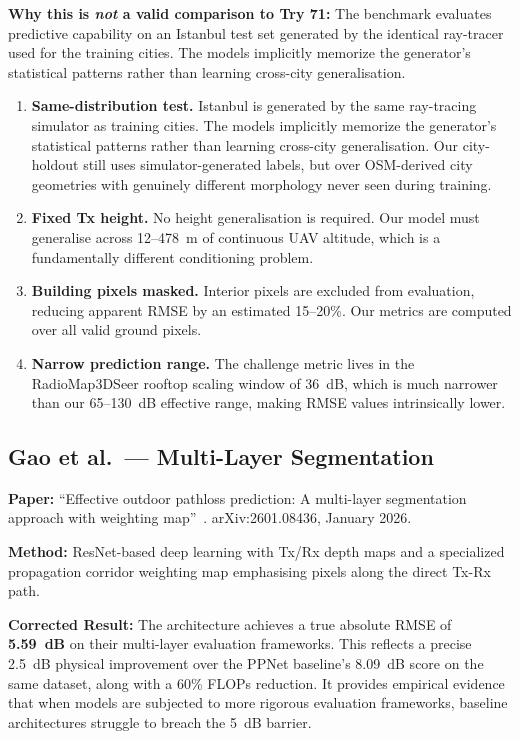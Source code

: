 \documentclass[11pt,a4paper]{article}
\begin{document}
\textbf{Why this is \emph{not} a valid comparison to Try 71:} The benchmark evaluates predictive capability on an Istanbul test set generated by the identical ray-tracer used for the training cities. The models implicitly memorize the generator's statistical patterns rather than learning cross-city generalisation.
\begin{enumerate}[nosep]
    \item \textbf{Same-distribution test.} Istanbul is generated by the same
          ray-tracing simulator as training cities. The models implicitly memorize
          the generator's statistical patterns rather than learning cross-city
          generalisation. Our city-holdout still uses simulator-generated labels,
          but over OSM-derived city geometries with genuinely different morphology
          never seen during training.

    \item \textbf{Fixed Tx height.} No height generalisation is required.
          Our model must generalise across 12--478~m of continuous UAV altitude,
          which is a fundamentally different conditioning problem.

    \item \textbf{Building pixels masked.} Interior pixels are excluded from
          evaluation, reducing apparent RMSE by an estimated 15--20\%. Our metrics
          are computed over all valid ground pixels.

    \item \textbf{Narrow prediction range.} The challenge metric lives in the
          RadioMap3DSeer rooftop scaling window of 36~dB, which is much narrower
          than our 65--130~dB effective range, making RMSE values intrinsically lower.
\end{enumerate}

\subsection{Gao et al.\ --- Multi-Layer Segmentation}

\textbf{Paper:} ``Effective outdoor pathloss prediction: A multi-layer segmentation
approach with weighting map''~\cite{gao2026}. arXiv:2601.08436, January 2026.

\textbf{Method:} ResNet-based deep learning with Tx/Rx depth maps and a specialized propagation corridor weighting map emphasising pixels along the direct Tx-Rx path.

\textbf{Corrected Result:} The architecture achieves a true absolute RMSE of \textbf{5.59~dB} on their multi-layer evaluation frameworks. This reflects a precise 2.5~dB physical improvement over the PPNet baseline's 8.09~dB score on the same dataset, along with a 60\% FLOPs reduction. It provides empirical evidence that when models are subjected to more rigorous evaluation frameworks, baseline architectures struggle to breach the 5~dB barrier.
\end{document}
